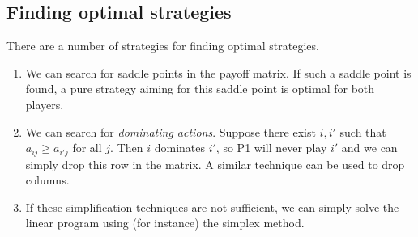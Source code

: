 \subsection{Finding optimal strategies}
There are a number of strategies for finding optimal strategies.
\begin{enumerate}
	\item We can search for saddle points in the payoff matrix.
	      If such a saddle point is found, a pure strategy aiming for this saddle point is optimal for both players.
	\item We can search for \textit{dominating actions}.
	      Suppose there exist \( i, i' \) such that \( a_{ij} \geq a_{i'j} \) for all \( j \).
	      Then \( i \) dominates \( i' \), so P1 will never play \( i' \) and we can simply drop this row in the matrix.
	      A similar technique can be used to drop columns.
	\item If these simplification techniques are not sufficient, we can simply solve the linear program using (for instance) the simplex method.
\end{enumerate}
